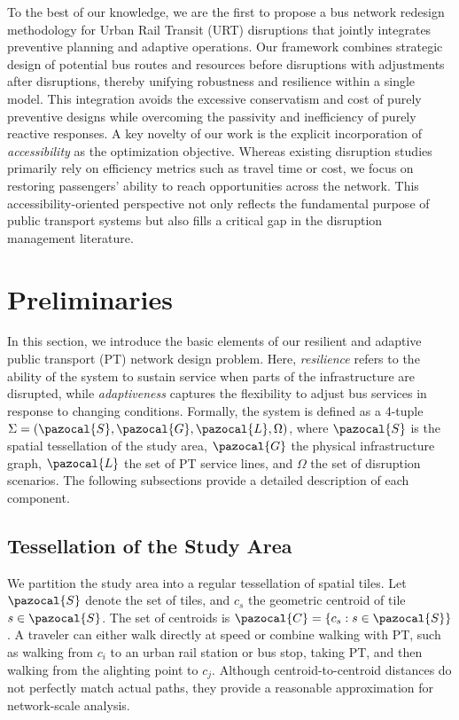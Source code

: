 \documentclass[3p,times,procedia]{elsarticle}
\begin{document}
To the best of our knowledge, we are the first to propose a bus network redesign methodology for Urban Rail Transit (URT) disruptions that jointly integrates preventive planning and adaptive operations. 
Our framework combines strategic design of potential bus routes and resources before disruptions with adjustments after disruptions, thereby unifying robustness and resilience within a single model. 
This integration avoids the excessive conservatism and cost of purely preventive designs while overcoming the passivity and inefficiency of purely reactive responses. 
A key novelty of our work is the explicit incorporation of \emph{accessibility} as the optimization objective. 
Whereas existing disruption studies primarily rely on efficiency metrics such as travel time or cost, 
we focus on restoring passengers’ ability to reach opportunities across the network. 
This accessibility-oriented perspective not only reflects the fundamental purpose of public transport systems but also fills a critical gap in the disruption management literature.


\section{Preliminaries}\label{sec:preliminaries}
In this section, we introduce the basic elements of our resilient and adaptive public transport (PT) network design problem. 
Here, \emph{resilience} refers to the ability of the system to sustain service when parts of the infrastructure are disrupted, while \emph{adaptiveness} captures the flexibility to adjust bus services in response to changing conditions. 
%
Formally, the system is defined as a 4-tuple 
$\Sigma = (\pazocal{S}, \pazocal{G}, \pazocal{L}, \Omega)$,
where $\pazocal{S}$ is the spatial tessellation of the study area, $\pazocal{G}$ the physical infrastructure graph, $\pazocal{L}$ the set of PT service lines, and $\Omega$ the set of disruption scenarios. 
%
The following subsections provide a detailed description of each component.

\subsection{Tessellation of the Study Area}\label{subsec:tessellation}
We partition the study area into a regular tessellation of spatial tiles. Let $\pazocal{S}$ denote the set of tiles, and $c_s$ the geometric centroid of tile $s \in \pazocal{S}$. The set of centroids is $\pazocal{C} = \{c_s : s \in \pazocal{S}\}$. 
%
A traveler can either walk directly at speed  or combine walking with PT, such as walking from $c_i$ to an urban rail station or bus stop, taking PT, and then walking from the alighting point to $c_j$. Although centroid-to-centroid distances do not perfectly match actual paths, they provide a reasonable approximation for network-scale analysis.
\end{document}
